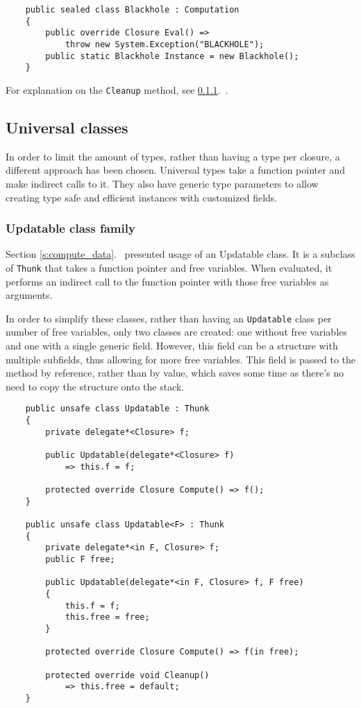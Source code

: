 \documentclass[en]{pracamgr}
\newcommand{\myref}[1]{\ref{#1}.~\textit{\nameref{#1}}}
\begin{document}
\begin{verbatim}
    public sealed class Blackhole : Computation
    {
        public override Closure Eval() =>
            throw new System.Exception("BLACKHOLE");
        public static Blackhole Instance = new Blackhole();
    }
\end{verbatim}

For explanation on the \texttt{Cleanup} method, see \myref{s:updatables}.

\subsection{Universal classes}\label{s:universal_classes}

In order to limit the amount of types, rather than having
a type per closure, a different approach has been chosen.
Universal types take a function pointer and make
indirect calls to it.
They also have generic type parameters to allow creating
type safe and efficient instances with customized fields.

\subsubsection{Updatable class family}\label{s:updatables}

Section \myref{s:compute_data} presented usage of an Updatable class.
It is a subclass of \texttt{Thunk} that takes a function
pointer and free variables. When evaluated, it performs an
indirect call to the function pointer with those free variables as arguments.

In order to simplify these classes, rather than having
an \texttt{Updatable} class per number of free variables,
only two classes are created:
one without free variables and one with a single generic
field. However, this field can be a structure with multiple
subfields, thus allowing for more free variables.
This field is passed to the method by reference, rather
than by value, which saves some time as there's no need to copy the structure onto the stack.

\begin{verbatim}
    public unsafe class Updatable : Thunk
    {
        private delegate*<Closure> f;

        public Updatable(delegate*<Closure> f)
            => this.f = f;

        protected override Closure Compute() => f();
    }

    public unsafe class Updatable<F> : Thunk
    {
        private delegate*<in F, Closure> f;
        public F free;

        public Updatable(delegate*<in F, Closure> f, F free)
        {
            this.f = f;
            this.free = free;
        }

        protected override Closure Compute() => f(in free);
        
        protected override void Cleanup()
            => this.free = default;
    }
\end{verbatim}
\end{document}
